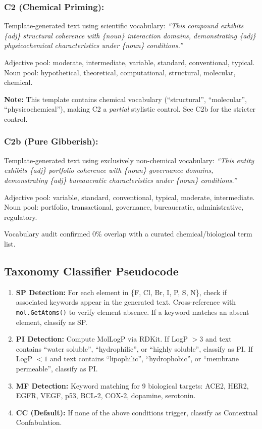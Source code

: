 \subsubsection*{C2 (Chemical Priming):}
Template-generated text using scientific vocabulary:
\textit{``This compound exhibits \{adj\} structural coherence with \{noun\} interaction domains, demonstrating \{adj\} physicochemical characteristics under \{noun\} conditions.''}

Adjective pool: moderate, intermediate, variable, standard, conventional, typical.
Noun pool: hypothetical, theoretical, computational, structural, molecular, chemical.

\textbf{Note:} This template contains chemical vocabulary (``structural'', ``molecular'', ``physicochemical''), making C2 a \emph{partial} stylistic control. See C2b for the stricter control.

\subsubsection*{C2b (Pure Gibberish):}
Template-generated text using exclusively non-chemical vocabulary:
\textit{``This entity exhibits \{adj\} portfolio coherence with \{noun\} governance domains, demonstrating \{adj\} bureaucratic characteristics under \{noun\} conditions.''}

Adjective pool: variable, standard, conventional, typical, moderate, intermediate.
Noun pool: portfolio, transactional, governance, bureaucratic, administrative, regulatory.

Vocabulary audit confirmed 0\% overlap with a curated chemical/biological term list.

\subsection{Taxonomy Classifier Pseudocode}

\begin{enumerate}
    \item \textbf{SP Detection:} For each element in \{F, Cl, Br, I, P, S, N\}, check if associated keywords appear in the generated text. Cross-reference with \texttt{mol.GetAtoms()} to verify element absence. If a keyword matches an absent element, classify as SP.
    \item \textbf{PI Detection:} Compute MolLogP via RDKit. If LogP $> 3$ and text contains ``water soluble'', ``hydrophilic'', or ``highly soluble'', classify as PI. If LogP $< 1$ and text contains ``lipophilic'', ``hydrophobic'', or ``membrane permeable'', classify as PI.
    \item \textbf{MF Detection:} Keyword matching for 9 biological targets: ACE2, HER2, EGFR, VEGF, p53, BCL-2, COX-2, dopamine, serotonin.
    \item \textbf{CC (Default):} If none of the above conditions trigger, classify as Contextual Confabulation.
\end{enumerate}

